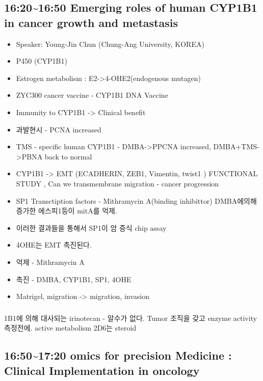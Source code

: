\documentclass[]{book}
\providecommand{\tightlist}{%
  \setlength{\itemsep}{0pt}\setlength{\parskip}{0pt}}
\begin{document}
\subsection{16:20\textasciitilde{}16:50 Emerging roles of human CYP1B1
in cancer growth and
metastasis}\label{emerging-roles-of-human-cyp1b1-in-cancer-growth-and-metastasis}

\begin{itemize}
\tightlist
\item
  Speaker: Young-Jin Chun (Chung-Ang University, KOREA)
\item
  P450 (CYP1B1)
\item
  Estrogen metabolism : E2-\textgreater{}4-OHE2(endogenous mutagen)
\item
  ZYC300 cancer vaccine - CYP1B1 DNA Vaccine
\item
  Immunity to CYP1B1 -\textgreater{} Clinical benefit
\item
  과발현시 - PCNA increased
\item
  TMS - specific human CYP1B1 - DMBA-\textgreater{}PPCNA increased,
  DMBA+TMS-\textgreater{}PBNA back to normal
\item
  CYP1B1 -\textgreater{} EMT (ECADHERIN, ZEB1, Vimentin, twist1 )
  FUNCTIONAL STUDY , Can we transmembrane migration - cancer progression
\item
  SP1 Transctiption factors - Mithramycin A(binding inhibittor)
  DMBA에의해 증가한 에스피1등이 mitA를 억제.
\item
  이러한 결과들을 통해서 SP1이 암 증식 chip assay
\item
  4OHE는 EMT 촉진된다.
\item
  억제 - Mithramycin A
\item
  촉진 - DMBA, CYP1B1, SP1, 4OHE
\item
  Matrigel, migration -\textgreater{} migration, invasion
\end{itemize}

\subsubsection{}\label{section}

1B1에 의해 대사되는 irinotecan - 알수가 없다. Tumor 조직을 갖고 enzyme
activity 측정전에. active metabolism 2D6는 steroid

\subsection{16:50\textasciitilde{}17:20 omics for precision Medicine :
Clinical Implementation in
oncology}\label{omics-for-precision-medicine-clinical-implementation-in-oncology}
\end{document}
